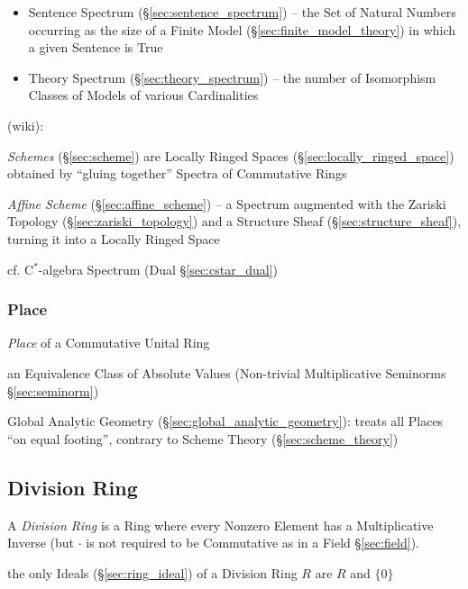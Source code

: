 \begin{itemize}
\begin{itemize}
  \item Sentence Spectrum (\S\ref{sec:sentence_spectrum}) -- the Set of Natural
    Numbers occurring as the size of a Finite Model
    (\S\ref{sec:finite_model_theory}) in which a given Sentence is True
  \item Theory Spectrum (\S\ref{sec:theory_spectrum}) -- the number of
    Isomorphism Classes of Models of various Cardinalities
\end{itemize}

(wiki):

\fist \emph{Schemes} (\S\ref{sec:scheme}) are Locally Ringed Spaces
(\S\ref{sec:locally_ringed_space}) obtained by ``gluing together'' Spectra of
Commutative Rings

\fist \emph{Affine Scheme} (\S\ref{sec:affine_scheme}) -- a Spectrum augmented
with the Zariski Topology (\S\ref{sec:zariski_topology}) and a Structure Sheaf
(\S\ref{sec:structure_sheaf}), turning it into a Locally Ringed Space

\fist cf. C$^*$-algebra Spectrum (Dual \S\ref{sec:cstar_dual})



\subsubsection{Place}\label{sec:place}

\emph{Place} of a Commutative Unital Ring

an Equivalence Class of Absolute Values (Non-trivial Multiplicative Seminorms
\S\ref{sec:seminorm})

\fist Global Analytic Geometry (\S\ref{sec:global_analytic_geometry}): treats
all Places ``on equal footing'', contrary to Scheme Theory
(\S\ref{sec:scheme_theory})



\subsection{Division Ring}\label{sec:division_ring}

A \emph{Division Ring} is a Ring where every Nonzero Element has a
Multiplicative Inverse (but $\cdot$ is not required to be Commutative
as in a Field \S\ref{sec:field}).

the only Ideals (\S\ref{sec:ring_ideal}) of a Division Ring $R$ are $R$ and
$\{0\}$


\end{itemize}
